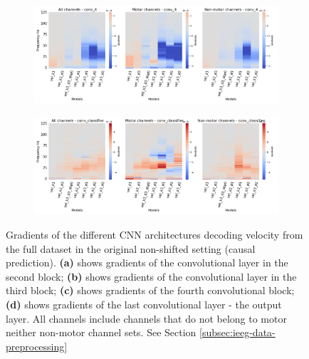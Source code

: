 \begin{figure}[!htbp]\ContinuedFloat
\begin{subfigure}[c]{\textwidth}
   \includegraphics[width=0.9\linewidth]{img/appendix/A/conv-4/m/vel-model-gradients_all_kinds}
   \caption{}
   \label{fig:vel-full-grad-covn4}
\end{subfigure}

\begin{subfigure}[d]{\textwidth}
   \includegraphics[width=0.9\linewidth]{img/appendix/A/conv-classifier/m/vel-model-gradients_all_kinds}
   \caption{}
   \label{fig:vel-full-grads-conv-classifier}
\end{subfigure}

\caption[]{Gradients of the different CNN architectures decoding velocity from the full dataset in the original non-shifted setting (causal prediction). \textbf{(a)} shows gradients of the convolutional layer in the second block; \textbf{(b)} shows gradients of the convolutional layer in the third block; \textbf{(c)} shows gradients of the fourth convolutional block; \textbf{(d)} shows gradients of the last convolutional layer - the output layer. All channels include channels that do not belong to motor neither non-motor channel sets. See Section \ref{subsec:ieeg-data-preprocessing}}
\label{fig:vel-full-grads}
\end{figure}
\clearpage
